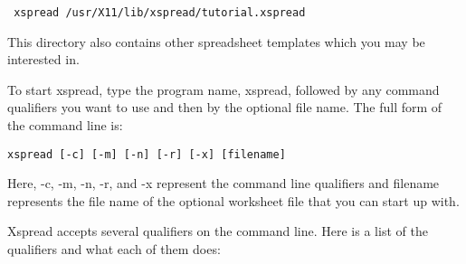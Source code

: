 \verb| xspread /usr/X11/lib/xspread/tutorial.xspread|

This directory also contains other spreadsheet templates which you may be 
interested in.

    To start xspread, type the program name, xspread, followed by any command 
qualifiers you want to use and then by the optional file name.  The full form 
of the command line is:

{\tt   xspread [-c] [-m] [-n] [-r] [-x] [filename]}

Here, -c, -m, -n, -r, and -x represent the command line qualifiers and 
filename represents the file name of the optional worksheet file that you can 
start up with.

    Xspread accepts several qualifiers on the command line.  Here is a list of
the qualifiers and what each of them does:
